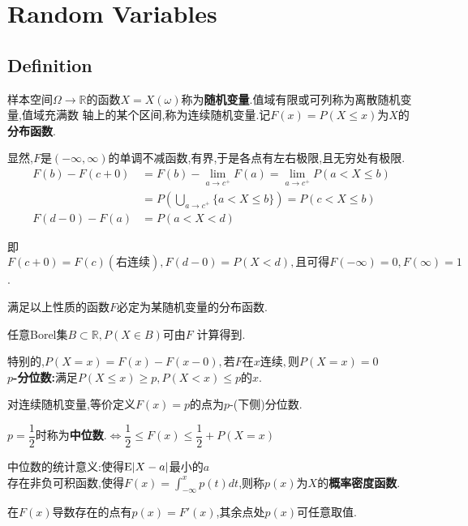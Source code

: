 
\section{Random Variables}
\subsection{Definition}
样本空间$ \Omega \rightarrow \mathbb{R}$的函数$ X = X(\omega)$称为\textbf{随机变量}.值域有限或可列称为离散随机变量,值域充满数
轴上的某个区间,称为连续随机变量.记$ F(x) = P(X \le x)$为$ X$的\textbf{分布函数}.

显然,$ F$是$ (-\infty, \infty)$的单调不减函数,有界,于是各点有左右极限,且无穷处有极限.
\begin{equation*}
	\begin{split}
		F(b) - F(c + 0) & = F(b) - \lim \limits_{a \to c^{+}} F(a) =\lim \limits_{a \to c^{+}}P(a < X \le b) \\
		                & = P(\bigcup_{a \to c^{+}}\{a < X \le b\}) = P(c < X \le b)                         \\
		F(d - 0) - F(a) & = P(a < X < d)
	\end{split}
\end{equation*}

即$ F(c + 0) = F(c)(右连续), F(d - 0) = P(X<d), 且可得F(-\infty) = 0, F(\infty) = 1$.

满足以上性质的函数$ F$必定为某随机变量的分布函数.

任意Borel集$ B\subset \mathbb{R}, P(X \in B) 可由F$ 计算得到.

特别的,$ P(X=x) = F(x) - F(x - 0),若F在x连续,则P(X=x) = 0$
\\

\textbf{$p$-分位数:}满足$ P(X \le x) \ge p, P(X <x) \le p 的x. $

对连续随机变量,等价定义$F(x) = p$的点为$p$-(下侧)分位数.

$ p =\dfrac{1}{2}$时称为\textbf{中位数}.$\Leftrightarrow \dfrac{1}{2} \le F(x) \le \dfrac{1}{2} + P(X=x) $

中位数的统计意义:使得$\text{E}|X-a|$最小的$a$
\\

存在非负可积函数,使得$ F(x) = \int_{-\infty}^{x}{p(t)dt}$,则称$ p(x)$为$ X$的\textbf{概率密度函数}.

在$ F(x)$导数存在的点有$ p(x) = F'(x)$,其余点处$ p(x)$可任意取值.
\\

